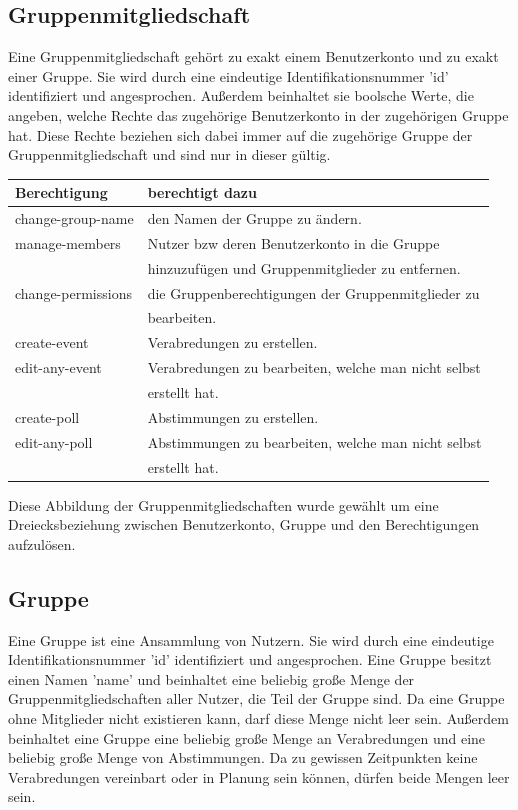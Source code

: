 \documentclass[parskip=full,11pt]{scrartcl}
\begin{document}
\subsection{Gruppenmitgliedschaft}
Eine Gruppenmitgliedschaft gehört zu exakt einem Benutzerkonto und zu exakt
einer Gruppe. Sie wird durch eine eindeutige Identifikationsnummer 'id'
identifiziert und angesprochen. Außerdem beinhaltet sie boolsche Werte,
die angeben, welche Rechte das zugehörige Benutzerkonto in der zugehörigen
Gruppe hat. Diese Rechte beziehen sich dabei immer auf die zugehörige Gruppe
der Gruppenmitgliedschaft und sind nur in dieser gültig.\\
\begin{tabular}[t]{ l l }
    \textbf{Berechtigung} & \textbf{berechtigt dazu}\\
    \hline
    change-group-name & den Namen der Gruppe zu ändern.\\
    manage-members & Nutzer bzw deren Benutzerkonto in die Gruppe\\
     & hinzuzufügen und Gruppenmitglieder zu entfernen.\\
    change-permissions & die Gruppenberechtigungen der
        Gruppenmitglieder zu\\
     & bearbeiten.\\
    create-event & Verabredungen zu erstellen.\\
    edit-any-event & Verabredungen zu bearbeiten, welche man nicht
        selbst\\
     & erstellt hat.\\
    create-poll & Abstimmungen zu erstellen.\\
    edit-any-poll & Abstimmungen zu bearbeiten, welche man nicht
    selbst\\
     & erstellt hat.\\
\end{tabular}

Diese Abbildung der Gruppenmitgliedschaften wurde gewählt um eine
Dreiecksbeziehung zwischen Benutzerkonto,
Gruppe und den Berechtigungen aufzulösen.

\pagebreak


\subsection{Gruppe}
Eine Gruppe ist eine Ansammlung von Nutzern. Sie wird durch eine eindeutige
Identifikationsnummer 'id' identifiziert und angesprochen. Eine Gruppe besitzt
einen Namen 'name' und beinhaltet eine beliebig große Menge der
Gruppenmitgliedschaften aller Nutzer, die Teil der Gruppe sind.
Da eine Gruppe ohne Mitglieder nicht existieren kann, darf diese Menge nicht
leer sein. Außerdem beinhaltet eine Gruppe eine beliebig große Menge an
Verabredungen und eine beliebig große Menge von Abstimmungen.
Da zu gewissen Zeitpunkten keine Verabredungen vereinbart oder in Planung sein
können, dürfen beide Mengen leer sein.
\\
\\
\\
\end{document}
